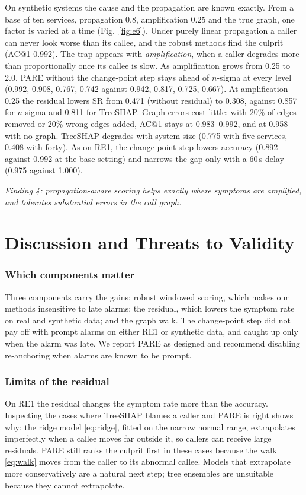\documentclass[conference]{IEEEtran}
\begin{document}
On synthetic systems the cause and the propagation are known exactly. From a base
of ten services, propagation 0.8, amplification 0.25 and the true graph, one factor
is varied at a time (Fig.~\ref{fig:e6}). Under purely linear propagation a caller
can never look worse than its callee, and the robust methods find the culprit
(AC@1 0.992). The trap appears with \emph{amplification}, when a caller degrades
more than proportionally once its callee is slow. As amplification grows from 0.25
to 2.0, PARE without the change-point step stays ahead of $n$-sigma at every level
(0.992, 0.908, 0.767, 0.742 against 0.942, 0.817, 0.725, 0.667). At amplification
0.25 the residual lowers SR from 0.471 (without residual) to 0.308, against 0.857 for
$n$-sigma and 0.811 for TreeSHAP. Graph errors cost little: with 20\% of edges
removed or 20\% wrong edges added, AC@1 stays at 0.983--0.992, and at 0.958 with no
graph. TreeSHAP degrades with system size (0.775 with five services, 0.408 with
forty). As on RE1, the change-point step lowers accuracy (0.892 against 0.992 at the
base setting) and narrows the gap only with a 60\,s delay (0.975 against 1.000).

\noindent\textit{Finding 4: propagation-aware scoring helps exactly where symptoms
are amplified, and tolerates substantial errors in the call graph.}

\section{Discussion and Threats to Validity}

\subsubsection{Which components matter}
Three components carry the gains: robust windowed scoring, which makes our methods
insensitive to late alarms; the residual, which lowers the symptom rate on real and
synthetic data; and the graph walk. The change-point step did not pay off with
prompt alarms on either RE1 or synthetic data, and caught up only when the alarm was
late. We report PARE as designed and recommend disabling re-anchoring when alarms
are known to be prompt.

\subsubsection{Limits of the residual}
On RE1 the residual changes the symptom rate more than the accuracy. Inspecting the
cases where TreeSHAP blames a caller and PARE is right shows why: the ridge model
\eqref{eq:ridge}, fitted on the narrow normal range, extrapolates imperfectly when a
callee moves far outside it, so callers can receive large residuals. PARE still
ranks the culprit first in these cases because the walk \eqref{eq:walk} moves from
the caller to its abnormal callee. Models that extrapolate more conservatively are
a natural next step; tree ensembles are unsuitable because they cannot extrapolate.
\end{document}
